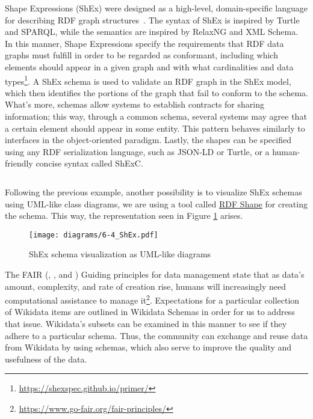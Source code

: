 Shape Expressions (ShEx) were designed as a high-level, domain-specific language for describing RDF graph structures~\cite{https://doi.org/10.48550/arxiv.2110.11709}. The syntax of ShEx is inspired by Turtle and SPARQL, while the semantics are inspired by RelaxNG and XML Schema. In this manner, Shape Expressions specify the requirements that RDF data graphs must fulfill in order to be regarded as conformant, including which elements should appear in a given graph and with what cardinalities and data types\footnote{\url{https://shexspec.github.io/primer/}}. A ShEx schema is used to validate an RDF graph in the ShEx model, which then identifies the portions of the graph that fail to conform to the schema. What's more, schemas allow systems to establish contracts for sharing information; this way, through a common schema, several systems may agree that a certain element should appear in some entity. This pattern behaves similarly to interfaces in the object-oriented paradigm. Lastly, the shapes can be specified using any RDF serialization language, such as JSON-LD or Turtle, or a human-friendly concise syntax called ShExC.

\begin{code}
    \inputminted{shex}{code/listings/6-4_shex.shex}
\end{code}

Following the previous example, another possibility is to visualize ShEx schemas using UML-like class diagrams, we are using a tool called \href{https://rdfshape.weso.es/shexInfo}{RDF Shape} for creating the schema. This way, the representation seen in Figure \ref{fig:RDFshape} arises.

\begin{figure}[ht]
    \centering
    \texttt{[image: diagrams/6-4\_ShEx.pdf]}
    \caption{ShEx schema visualization as UML-like diagrams}
    \label{fig:RDFshape}
\end{figure}

The FAIR (, ,  and ) Guiding principles for data management state that as data's amount, complexity, and rate of creation rise, humans will increasingly need computational assistance to manage it\footnote{\url{https://www.go-fair.org/fair-principles/}}. Expectations for a particular collection of Wikidata items are outlined in Wikidata Schemas in order for us to address that issue. Wikidata's subsets can be examined in this manner to see if they adhere to a particular schema. Thus, the community can exchange and reuse data from Wikidata by using schemas, which also serve to improve the quality and usefulness of the data.

